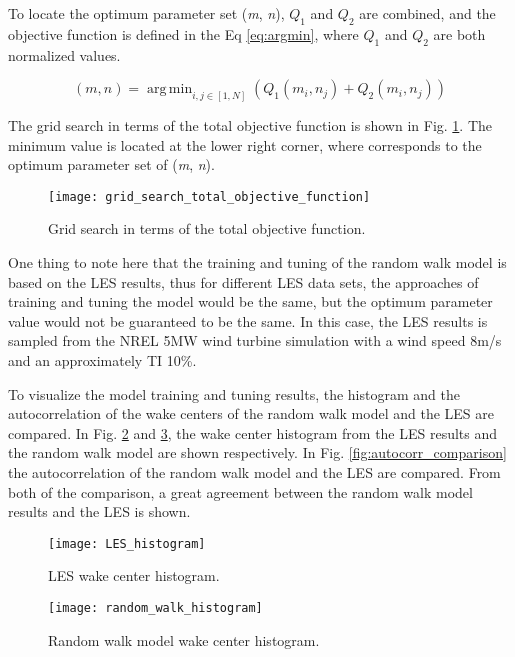 \documentclass{umthesis}
\DeclareMathOperator*{\argmin}{arg\,min} %
\begin{document}
To locate the optimum parameter set (\textit{m}, \textit{n}), $Q_1$ and $Q_2$ are combined, and the objective function is defined in the Eq \ref{eq:argmin}, where $Q_1$ and $Q_2$ are both normalized values.

\begin{equation}\label{eq:argmin}
  (m,n) = \argmin_{i,j\in[1,N]} (Q_1(m_i,n_j) + Q_2(m_i,n_j))
\end{equation}

The grid search in terms of the total objective function is shown in Fig. \ref{fig:objective}. The minimum value is located at the lower right corner, where corresponds to the optimum parameter set of (\textit{m}, \textit{n}).

\begin{figure}
  \centering
  \texttt{[image: grid\_search\_total\_objective\_function]}
  \caption{Grid search in terms of the total objective function.}\label{fig:objective}
\end{figure}

One thing to note here that the training and tuning of the random walk model is based on the LES results, thus for different LES data sets, the approaches of training and tuning the model would be the same, but the optimum parameter value would not be guaranteed to be the same. In this case, the LES results is sampled from the NREL 5MW wind turbine simulation with a wind speed 8m/s and an approximately TI 10\%.

To visualize the model training and tuning results, the histogram and the autocorrelation of the wake centers of the random walk model and the LES are compared. In Fig. \ref{fig:les_hist} and \ref{fig:rw_hist}, the wake center histogram from the LES results and the random walk model are shown respectively. In Fig. \ref{fig:autocorr_comparison} the autocorrelation of the random walk model and the LES are compared. From both of the comparison, a great agreement between the random walk model results and the LES is shown.

\begin{figure}
  \centering
  \texttt{[image: LES\_histogram]}
  \caption{LES wake center histogram.}\label{fig:les_hist}
\end{figure}

\begin{figure}
  \centering
  \texttt{[image: random\_walk\_histogram]}
  \caption{Random walk model wake center histogram.}\label{fig:rw_hist}
\end{figure}
\end{document}
